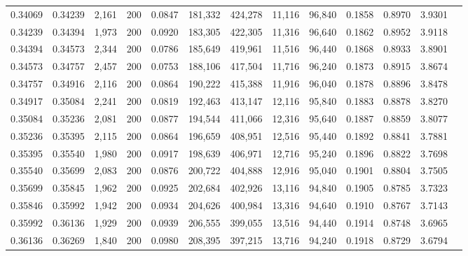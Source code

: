 \begin{tabular}{rrrrrrrrrrrrr}
0.34069 & 0.34239 & 2,161 & 200 &                                     0.0847 & 181,332 & 424,278 &  11,116 &  96,840 & 0.1858 & 0.8970 & 3.9301 \\
0.34239 & 0.34394 & 1,973 & 200 &                                     0.0920 & 183,305 & 422,305 &  11,316 &  96,640 & 0.1862 & 0.8952 & 3.9118 \\
0.34394 & 0.34573 & 2,344 & 200 &                                     0.0786 & 185,649 & 419,961 &  11,516 &  96,440 & 0.1868 & 0.8933 & 3.8901 \\
0.34573 & 0.34757 & 2,457 & 200 &                                     0.0753 & 188,106 & 417,504 &  11,716 &  96,240 & 0.1873 & 0.8915 & 3.8674 \\
0.34757 & 0.34916 & 2,116 & 200 &                                     0.0864 & 190,222 & 415,388 &  11,916 &  96,040 & 0.1878 & 0.8896 & 3.8478 \\
0.34917 & 0.35084 & 2,241 & 200 &                                     0.0819 & 192,463 & 413,147 &  12,116 &  95,840 & 0.1883 & 0.8878 & 3.8270 \\
0.35084 & 0.35236 & 2,081 & 200 &                                     0.0877 & 194,544 & 411,066 &  12,316 &  95,640 & 0.1887 & 0.8859 & 3.8077 \\
0.35236 & 0.35395 & 2,115 & 200 &                                     0.0864 & 196,659 & 408,951 &  12,516 &  95,440 & 0.1892 & 0.8841 & 3.7881 \\
0.35395 & 0.35540 & 1,980 & 200 &                                     0.0917 & 198,639 & 406,971 &  12,716 &  95,240 & 0.1896 & 0.8822 & 3.7698 \\
0.35540 & 0.35699 & 2,083 & 200 &                                     0.0876 & 200,722 & 404,888 &  12,916 &  95,040 & 0.1901 & 0.8804 & 3.7505 \\
0.35699 & 0.35845 & 1,962 & 200 &                                     0.0925 & 202,684 & 402,926 &  13,116 &  94,840 & 0.1905 & 0.8785 & 3.7323 \\
0.35846 & 0.35992 & 1,942 & 200 &                                     0.0934 & 204,626 & 400,984 &  13,316 &  94,640 & 0.1910 & 0.8767 & 3.7143 \\
0.35992 & 0.36136 & 1,929 & 200 &                                     0.0939 & 206,555 & 399,055 &  13,516 &  94,440 & 0.1914 & 0.8748 & 3.6965 \\
0.36136 & 0.36269 & 1,840 & 200 &                                     0.0980 & 208,395 & 397,215 &  13,716 &  94,240 & 0.1918 & 0.8729 & 3.6794 \\

\end{tabular}
